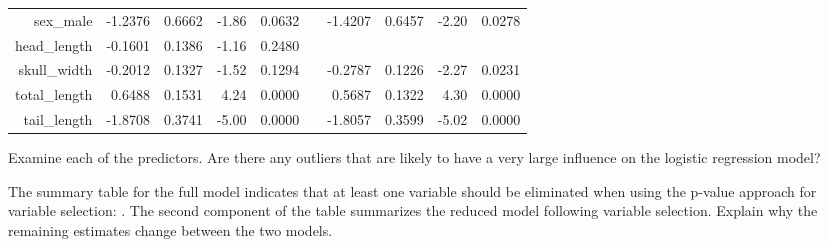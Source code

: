 {\begin{center}
\begin{tabular}{r rrrr r rrrr}
sex\_\hspace{0.3mm}male     & -1.2376 & 0.6662  & -1.86 & 0.0632 &
                            & -1.4207 & 0.6457  & -2.20 & 0.0278 \\ 
head\_\hspace{0.3mm}length  & -0.1601 & 0.1386  & -1.16 & 0.2480 \\ 
skull\_\hspace{0.3mm}width  & -0.2012 & 0.1327  & -1.52 & 0.1294 &
                            & -0.2787 & 0.1226  & -2.27 & 0.0231 \\ 
total\_\hspace{0.3mm}length & 0.6488  & 0.1531  & 4.24  & 0.0000 &
                            & 0.5687  & 0.1322  & 4.30  & 0.0000 \\ 
tail\_\hspace{0.3mm}length  & -1.8708 & 0.3741  & -5.00 & 0.0000 &
                            & -1.8057 & 0.3599  & -5.02 & 0.0000 \\ 
  \hline
\end{tabular}
\end{center}
\begin{parts}
\item Examine each of the predictors. Are there any outliers that are likely to 
have a very large influence on the logistic regression model?
\item The summary table for the full model indicates that at least one variable 
should be eliminated when using the p-value approach for variable selection: 
. The second component of the table summarizes 
the reduced model following variable selection. Explain why the remaining estimates 
change between the two models.
\end{parts}
}{}


